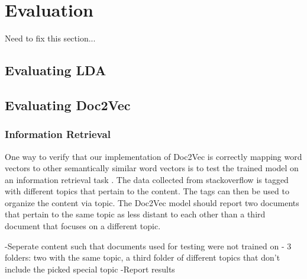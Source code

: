 
\section{Evaluation}
Need to fix this section...

\subsection{Evaluating LDA}

\subsection{Evaluating Doc2Vec}

\subsubsection{Information Retrieval}

One way to verify that our implementation of Doc2Vec is correctly mapping word vectors to other semantically similar word vectors is to test the trained model on an information retrieval task . \cite{RefWorks:doc:5a6e5746e4b0d609eec798d7} The data collected from stackoverflow is tagged with different topics that pertain to the content. The tags can then be used to organize the content via topic. The Doc2Vec model should report two documents that pertain to the same topic as less distant to each other than a third document that focuses on a different topic.

-Seperate content such that documents used for testing were not trained on
- 3 folders: two with the same topic, a third folder of different topics that don't include the picked special topic
-Report results
